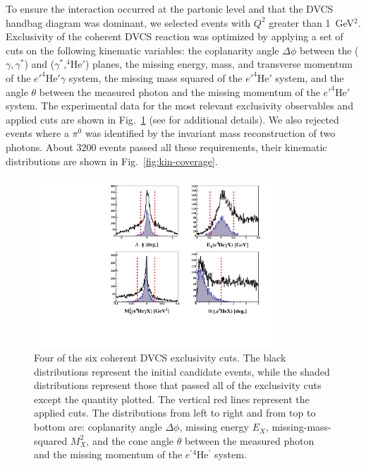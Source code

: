 \documentclass[twocolumn,nofootinbib,showpacs,prl,superscriptaddress,secnumarabic,amssymb,nobibnotes,aps,floatfix]{revtex4}
\begin{document}
To ensure the interaction occurred at the partonic level and that the DVCS handbag 
diagram was dominant, we selected events with $Q^{2}$ greater than 
1~GeV$^{2}$. Exclusivity of the coherent DVCS reaction was optimized by 
applying a set of cuts on the following kinematic variables: the coplanarity 
angle $\Delta\phi$ between the ($\gamma,\gamma^*$) 
and ($\gamma^*$,$^4$He$'$) planes, the missing energy, mass, and transverse
momentum of the $e'^4$He$'\gamma$ system, the missing mass squared of 
the $e'^4$He$'$ system, and the angle $\theta$
between the measured photon and the missing momentum of the $e'^4$He$'$ system.  
The experimental data for the most relevant exclusivity observables and applied
cuts are shown in Fig.~\ref{fig:kin-cuts} (see \cite{Hattawy:thesis} for 
additional details). We also 
rejected events where a $\pi^0$ was identified by the invariant mass reconstruction of 
two photons. About 3200 events passed all these requirements, their kinematic 
distributions are shown in Fig.~\ref{fig:kin-coverage}.

\begin{figure}[tb]
\includegraphics[width=9cm]{figs/F_all_coh_exc_cuts-pub.pdf}
\caption{Four of the six coherent DVCS exclusivity cuts. The black 
distributions represent the initial candidate events, while the shaded 
distributions represent those that passed all of the exclusivity cuts except 
the quantity plotted. The vertical red lines represent the applied cuts.
The distributions from left to right and from top to bottom are: coplanarity 
angle $\Delta \phi$, missing energy $E_X$, missing-mass-squared $M_X^2$, and 
the cone angle $\theta$ between the measured photon and the missing momentum 
of the $e^\prime{^4}$He$^\prime$ system.}
\label{fig:kin-cuts}
\end{figure}
 
\end{document}
